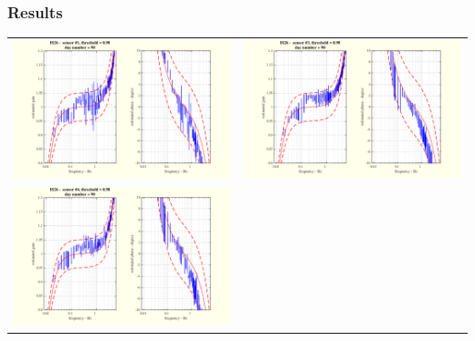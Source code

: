 \documentclass[handout,10pt]{beamer}
\begin{document}
\begin{frame}
\frametitle{Results}
\begin{tabular}{cc}
\includegraphics[scale=0.25]{3monthsonIS26SUTboxplot1-eps-converted-to.pdf}
&
\includegraphics[scale=0.25]{3monthsonIS26SUTboxplot3-eps-converted-to.pdf}
\\
\includegraphics[scale=0.25]{3monthsonIS26SUTboxplot4-eps-converted-to.pdf}

\end{tabular}
\end{frame}
\end{document}
